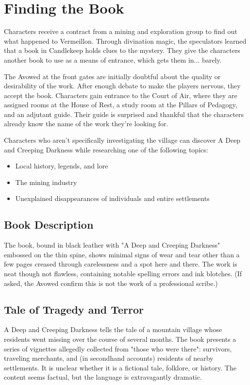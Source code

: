 \documentclass[10pt,a4paper,twoside,bg=print,twocolumn,openany,nodeprecatedcode]{dndbook}
\begin{document}
\section{Finding the Book}
Characters receive a contract from a mining and exploration group to find out what happened to Vermeillon. Through divination magic, the speculators learned that a book in Candlekeep holds clues to the mystery. They give the characters another book to use as a means of entrance, which gets them in... barely.

The Avowed at the front gates are initially doubtful about the quality or desirability of the work. After enough debate to make the players nervous, they accept the book. Characters gain entrance to the Court of Air, where they are assigned rooms at the House of Rest, a study room at the Pillars of Pedagogy, and an adjutant guide. Their guide is surprised and thankful that the characters already know the name of the work they're looking for.

Characters who aren't specifically investigating the village can discover A Deep and Creeping Darkness while researching one of the following topics:


\begin{itemize}
\item Local history, legends, and lore
\item The mining industry
\item Unexplained disappearances of individuals and entire settlements
\end{itemize}

\subsection{Book Description}
The book, bound in black leather with "A Deep and Creeping Darkness" embossed on the thin spine, shows minimal signs of wear and tear other than a few pages creased through carelessness and a spot here and there. The work is neat though not flawless, containing notable spelling errors and ink blotches. (If asked, the Avowed confirm this is not the work of a professional scribe.)

\subsection{Tale of Tragedy and Terror}
A Deep and Creeping Darkness tells the tale of a mountain village whose residents went missing over the course of several months. The book presents a series of vignettes allegedly collected from "those who were there": survivors, traveling merchants, and (in secondhand accounts) residents of nearby settlements. It is unclear whether it is a fictional tale, folklore, or history. The content seems factual, but the language is extravagantly dramatic.
\end{document}
